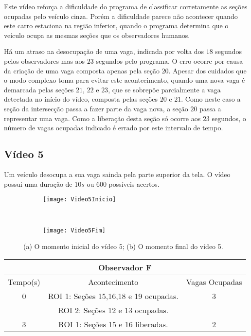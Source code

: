 Este vídeo reforça a dificuldade do programa de classificar corretamente as seções ocupadas pelo veículo cinza. Porém a dificuldade parece não acontecer quando este carro estaciona na região inferior, quando o programa determina que o veículo ocupa as mesmas seções que os observadores humanos.

Há um atraso na desocupação de uma vaga, indicada por volta dos $18$ segundos pelos observadores mas aos $23$ segundos pelo programa. O erro ocorre por causa da criação de uma vaga composta apenas pela seção $20$. Apesar dos cuidados que o modo complexo toma para evitar este acontecimento, quando uma nova vaga é demarcada pelas seções $21$, $22$ e $23$, que se sobrepõe parcialmente a vaga detectada no início do vídeo, composta pelas seções $20$ e $21$. Como neste caso a seção da intersecção passa a fazer parte da vaga nova, a seção $20$ passa a representar uma vaga. Como a liberação desta seção só ocorre aos $23$ segundos, o número de vagas ocupadas indicado é errado por este intervalo de tempo.


\subsection{Vídeo 5}

Um veículo desocupa a sua vaga sainda pela parte superior da tela. O vídeo possui uma duração de $10s$ ou $600$ possíveis acertos.

\begin{figure}[!h]
\centering
\begin{subfigure}{.5\textwidth}
\centering
\texttt{[image: Video5Inicio]}
\caption{}
\end{subfigure}\
\begin{subfigure}{.5\textwidth}
\centering
\texttt{[image: Video5Fim]}
\caption{}
\end{subfigure}
\centering
\caption{(a) O momento inicial do vídeo 5; (b) O momento final do vídeo 5.}%
\label{}%
\end{figure}

\begin{center}
\begin{tabular}{|c||c||c|}
\hline
\multicolumn{3}{|c|}{Observador F}  \\ \hline \hline
Tempo(s) & Acontecimento & Vagas Ocupadas\\ \hline
0 & ROI 1: Seções 15,16,18 e 19 ocupadas. & 3 \\
 & ROI 2: Seções 12 e 13 ocupadas. &  \\ \hline
3 & ROI 1: Seções 15 e 16 liberadas. & 2 \\
\hline
\end{tabular}
\end{center}

